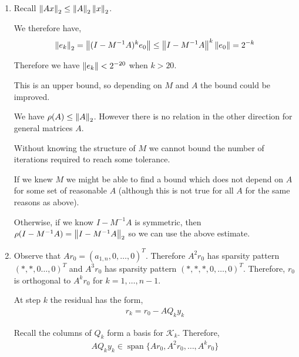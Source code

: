 \documentclass[10pt]{article}
\begin{document}
\begin{solution}[Solution]

\begin{enumerate}
    \item
        Recall \( \left\lVert Ax\right\rVert_2 \leq \left\lVert A\right\rVert_2\left\lVert x\right\rVert_2 \).

        We therefore have,
        \begin{align*}
            \left\lVert e_k\right\rVert_2 = \left\lVert(I-M^{-1}A)^k e_0\right\rVert
            \leq \left\lVert I-M^{-1}A\right\rVert^k \left\lVert e_0\right\rVert
            = 2^{-k}
        \end{align*}
        
        Therefore we have \( \left\lVert e_k\right\rVert < 2^{-20} \) when \( k > 20 \).

        This is an upper bound, so depending on \( M \) and \( A \) the bound could be improved.

        We have \( \rho(A) \leq \left\lVert A\right\rVert_2 \). However there is no relation in the other direction for general matrices \( A \). 

        Without knowing the structure of \( M \) we cannot bound the number of iterations required to reach some tolerance.

        If we knew \( M \) we might be able to find a bound which does not depend on \( A \) for some set of reasonable \( A \) (although this is not true for all \( A \) for the same reasons as above).

        Otherwise, if we know \( I-M^{-1}A \) is symmetric, then \( \rho(I-M^{-1}A) = \left\lVert I-M^{-1}A\right\rVert_2 \) so we can use the above estimate.

    \item
        Observe that \( Ar_0 = (a_{1,n}, 0,\ldots, 0)^T \). Therefore \( A^2 r_0 \) has sparsity pattern \( (*,*,0\ldots,0)^T \) and \( A^3r_0 \) has sparsity pattern \( (*,*,*,0,\ldots, 0)^T \). Therefore, \( r_0 \) is orthogonal to \( A^k r_0 \) for \( k=1,\ldots, n-1 \).

        
        
        At step \( k \) the residual has the form,
        \begin{align*}
            r_k = r_0 - AQ_ky_k
        \end{align*}
        
        Recall the columns of \( Q_k \) form a basis for \( \mathcal{K}_k \). Therefore,
        \begin{align*}
            AQ_ky_k \in \operatorname{span}\{Ar_0, A^2r_0, \ldots, A^k r_0\} 
        \end{align*}
        

\end{enumerate}
\end{solution}
\end{document}
